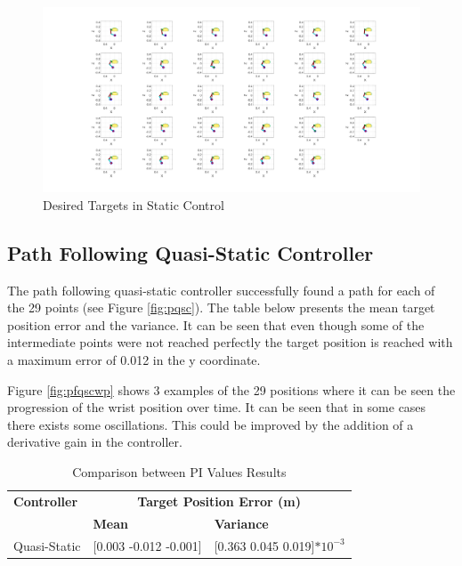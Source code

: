 \newpage
\begin{landscape} %
  \begin{figure}[h!]
    \centering
    \includegraphics[width=1.9\textwidth]{Pictures/Controller/Static29positions.png} %
    \caption{Desired Targets in Static Control} %
    \label{29statics}

  \end{figure}
\end{landscape} %




\subsection{Path Following Quasi-Static Controller}
The path following quasi-static controller successfully found a path for each of the 29 points (see Figure \ref{fig:pqsc}). The table below presents the mean target position error and the variance. It can be seen that even though some of the intermediate points were not reached perfectly the target position is reached with a maximum error of 0.012 in the y coordinate. 

Figure \ref{fig:pfqscwp} shows 3 examples of the 29 positions where it can be seen the progression of the wrist position over time. It can be seen that in some cases there exists some oscillations. This could be improved by the addition of a derivative gain in the controller. 


\begin{table}[h]
    \centering
    \scriptsize %
    \caption{Comparison between PI Values Results}
    \begin{tabularx}{\linewidth}{|X|X|X|}
        \hline
        \textbf{Controller} & \multicolumn{2}{c|}{\textbf{Target Position Error (m)}} \\
        \cline{2-3}
        & \textbf{Mean} & \textbf{Variance} \\
        \hline
        Quasi-Static & [0.003 -0.012 -0.001] & [0.363 0.045 0.019]$*10^{-3}$ \\
        \hline
    \end{tabularx}
\end{table}


